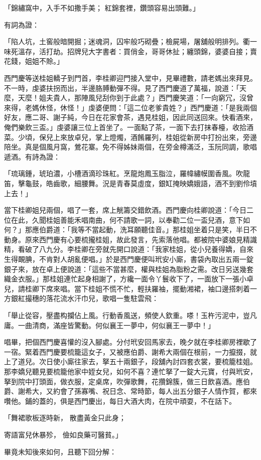\begin{showcontents}{}
「錦繡窩中，入手不如撒手美；  紅錦套裡，鑽頭容易出頭難。」

有詞為證：

「陷人坑，土窖般暗開掘；迷魂洞，囚牢般巧砌疊；檢屍場，屠舖般明排列。衢一味死溫存，活打劫。招牌兒大字書者：買俏金，哥哥休扯；纏頭錦，婆婆自接；賣花錢，姐姐不賒。」

西門慶等送桂姐轎子到門首，李桂卿迎門接入堂中，見畢禮數，請老媽出來拜見。不一時，虔婆扶拐而出，半邊胳膊動彈不得。見了西門慶道了萬福，說道：「天麼，天麼！姐夫貴人，那陣風兒刮你到于此處？」西門慶笑道：「一向窮冗，沒曾來得，老媽休怪，休怪！」虔婆便問：「這二位老爹貴姓？」西門慶道：「是我兩個好友，應二哥、謝子純，今日在花家會茶，遇見桂姐，因此同送回來。快看酒來，俺們樂飲三盃。」虔婆讓三位上首坐了。一面點了茶，一面下去打抹春檯，收拾酒菜。少頃，保兒上來放卓兒，掌上燈燭，酒餚羅列，桂姐從新房中打扮出來，旁邊陪坐。真是個風月窩，鶯花寨。免不得姊妹兩個，在旁金樽滿泛，玉阮同調，歌唱遞酒。有詩為證：

「琉璃鍾，琥珀濃，小槽酒滴珍珠紅。烹龍炮鳳玉脂泣，羅幃繡幙圍香風。吹龍笛，擊龜鼓，皓齒歌，細腰舞。況是青春莫虛度，銀缸掩映嬌娥語，酒不到劉伶墳上去！」

當下桂卿姐兒兩個，唱了一套，席上觥籌交錯飲酒。西門慶向桂卿說道：「今日二位在此，久聞桂姐善能禾唱南曲，何不請歌一詞，以奉勸二位一盃兒酒，意下如何？」那應伯爵道：「我等不當起動，洗耳願聽佳音。」那桂姐坐着只是笑，半日不動身。原來西門慶有心要梳攏桂姐，故此發言，先索落他唱。都被院中婆娘見精識精，看破了八九分。李桂卿在旁就先開口說道：「我家桂姐，從小兒養得嬌，自來生得靦腆，不肯對人胡亂便唱。」於是西門慶便叫玳安小廝，書袋內取出五兩一錠銀子來，放在卓上便說道：「這些不當甚麼，權與桂姐為脂粉之需。改日另送幾套織金衣服。」那桂姐連忙起身相謝了，方纔一面令丫鬟收下了，一面放下一張小卓兒，請桂卿下席來唱。當下桂姐不慌不忙，輕扶羅袖，擺動湘裙，袖口邊搭刺着一方銀紅撮穗的落花流水汗巾兒，歌唱一隻駐雲飛：

「舉止從容，壓盡构攔佔上風。行動香風送，頻使人欽重。嗏！玉杵污泥中，豈凡庸。一曲清商，滿座皆驚動。何似襄王一夢中，何似襄王一夢中！」

唱畢，把個西門慶喜懽的沒入腳處。分付玳安回馬家去，晚夕就在李桂卿房裡歇了一宿。緊着西門慶要梳籠這女子，又被應伯爵、謝希大兩個在根前，一力攛掇，就上了道兒。次日使小廝往家去，拏五十兩銀子，段舖內討四套衣裳，要梳籠桂姐。那李嬌兒聽見要梳籠他家中姪女兒，如何不喜？連忙拏了一錠大元寶，付與玳安，拏到院中打頭面，做衣服，定桌席，吹彈歌舞，花攢錦簇，做三日飲喜酒。應伯爵、謝希大，又約會了孫寡嘴、祝日念、常時節，每人出五分銀子人情作賀，都來囋他。鋪的蓋的，俱是西門慶出，每日大酒大肉，在院中頑耍，不在話下。

「舞裙歌板逐時新，  散盡黃金只此身；

寄語富兒休暴殄，  儉如良藥可醫貧。」

畢竟未知後來如何，且聽下回分解：





\end{showcontents}

